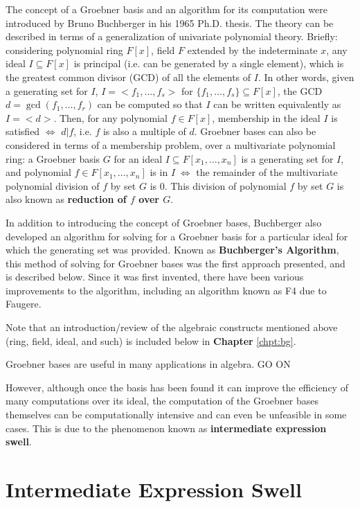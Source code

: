 \documentclass[letterpaper,12pt,titlepage,oneside,final]{book}
\begin{document}
The concept of a Groebner basis and an algorithm for its computation were introduced by Bruno Buchberger in his 1965 Ph.D. thesis.  The theory can be described in terms of a generalization of univariate polynomial theory.  Briefly: considering polynomial ring ${F[x]}$, field ${F}$ extended by the indeterminate ${x}$, any ideal ${I \subseteq F[x]}$ is principal (i.e. can be generated by a single element), which is the greatest common divisor (GCD) of all the elements of ${I}$.  In other words, given a generating set for ${I}$, ${I = <f_1, \ldots, f_s>}$ for ${\{f_1, \ldots, f_s\} \subseteq F[x]}$, the GCD ${d = \gcd(f_1, \ldots, f_r)}$ can be computed so that ${I}$ can be written equivalently as ${I = <d>}$.  Then, for any polynomial ${f \in F[x]}$, membership in the ideal ${I}$ is satisfied ${\iff}$ ${d | f}$, i.e. ${f}$ is also a multiple of ${d}$.  Groebner bases can also be considered in terms of a membership problem, over a multivariate polynomial ring: a Groebner basis ${G}$ for an ideal ${I \subseteq F[x_1, \ldots, x_n]}$ is a generating set for ${I}$, and polynomial ${f \in F[x_1, \ldots, x_n]}$ is in ${I \; \iff}$ the remainder of the multivariate polynomial division of ${f}$ by set ${G}$ is 0.  This division of polynomial ${f}$ by set ${G}$ is also known as \textbf{reduction of ${f}$ over ${G}$}. 

In addition to introducing the concept of Groebner bases, Buchberger also developed an algorithm for solving for a Groebner basis for a particular ideal for which the generating set was provided.  Known as \textbf{Buchberger's Algorithm}, this method of solving for Groebner bases was the first approach presented, and is described below.  Since it was first invented, there have been various improvements to the algorithm, including an algorithm known as F4 due to Faugere.    

Note that an introduction/review of the algebraic constructs mentioned above (ring, field, ideal, and such) is included below in \textbf{Chapter} \ref{chpt:bg}.    

Groebner bases are useful in many applications in algebra.  GO ON

However, although once the basis has been found it can improve the efficiency of many computations over its ideal, the computation of the Groebner bases themselves can be computationally intensive and can even be unfeasible in some cases.  This is due to the phenomenon known as \textbf{intermediate expression swell}. 

\section{Intermediate Expression Swell}
\end{document}
